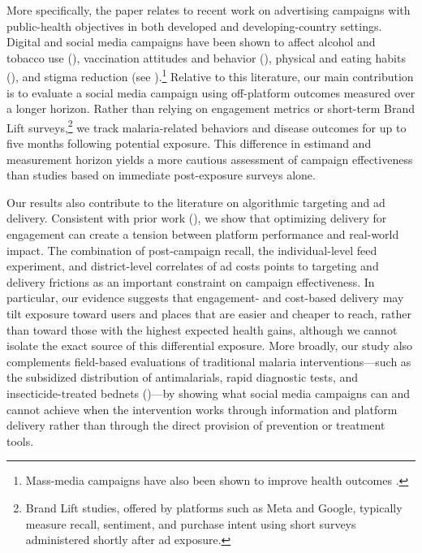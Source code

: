 More specifically, the paper relates to recent work on advertising campaigns with public-health objectives in both developed and developing-country settings. Digital and social media campaigns have been shown to affect alcohol and tobacco use (\citealt{wang2021investigating, thompson2013impact}), vaccination attitudes and behavior (\citealt{atheycovid2023, evans2023outcomes}), physical and eating habits (\citealt{carins2014eating}), and stigma reduction (see \citealt{Shawky2019}).\footnote{Mass-media campaigns have also been shown to improve health outcomes \citep{Orozco-Olvera2023}.} Relative to this literature, our main contribution is to evaluate a social media campaign using off-platform outcomes measured over a longer horizon. Rather than relying on engagement metrics or short-term Brand Lift surveys,\footnote{Brand Lift studies, offered by platforms such as Meta and Google, typically measure recall, sentiment, and purchase intent using short surveys administered shortly after ad exposure.} we track malaria-related behaviors and disease outcomes for up to five months following potential exposure. This difference in estimand and measurement horizon yields a more cautious assessment of campaign effectiveness than studies based on immediate post-exposure surveys alone. 

Our results also contribute to the literature on algorithmic targeting and ad delivery. Consistent with prior work (\citealt{lambrecht2019algorithmic, sapiezynski2022algorithms}), we show that optimizing delivery for engagement can create a tension between platform performance and real-world impact. The combination of post-campaign recall, the individual-level feed experiment, and district-level correlates of ad costs points to targeting and delivery frictions as an important constraint on campaign effectiveness. In particular, our evidence suggests that engagement- and cost-based delivery may tilt exposure toward users and places that are easier and cheaper to reach, rather than toward those with the highest expected health gains, although we cannot isolate the exact source of this differential exposure. More broadly, our study also complements field-based evaluations of traditional malaria interventions—such as the subsidized distribution of antimalarials, rapid diagnostic tests, and insecticide-treated bednets (\citealt{cohen2015price, tarozzi2014micro})—by showing what social media campaigns can and cannot achieve when the intervention works through information and platform delivery rather than through the direct provision of prevention or treatment tools.

